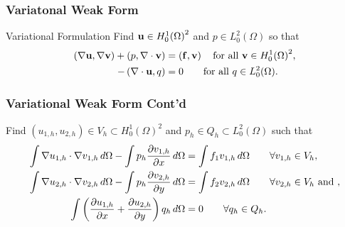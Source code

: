 \documentclass{beamer}
\begin{document}
\begin{frame}
    \frametitle{Variatonal Weak Form}
    \begin{block}{Variational Formulation}
        Find $\mathbf{u} \in H_{0}^{1}{(\Omega)}^2$ and $p \in L_{0}^{2}(\Omega)$
        so that
        \begin{equation}
            \begin{split}
                \left( \nabla \mathbf{u}, \nabla \mathbf{v} \right) + \left( p, \nabla
                    \cdot \mathbf{v} \right) &= \left(\mathbf{f}, \mathbf{v} \right)
                    \quad \text{for all } \mathbf{v} \in H_{0}^{1}
                    {(\Omega)}^{2}, \\
                -\left(\nabla \cdot \mathbf{u}, q \right) &= 0  \qquad \text{for
                    all } q \in{L}_{0}^{2} (\Omega).
            \end{split}
        \end{equation}
    \end{block}
\end{frame}


\begin{frame}
    \frametitle{Variational Weak Form Cont'd}
    Find $(u_{1,h}, u_{2,h}) \in V_h \subset H_{0}^{1}(\Omega)^2$ and $p_h \in
    Q_h \subset L_{0}^{2} (\Omega)$ such that
\begin{equation}
    \begin{split}
        \int \nabla u_{1,h} \cdot \nabla v_{1,h} \,d\Omega - \int p_h \frac{\partial
            v_{1,h}}{\partial x} \,d\Omega &= \int f_1 v_{1,h} \,d\Omega \qquad
            \forall v_{1,h} \in V_h, \\
        \int \nabla u_{2,h} \cdot \nabla v_{2,h} \,d\Omega - \int p_h \frac{\partial
            v_{2,h}}{\partial y} \,d\Omega &= \int f_2 v_{2,h} \,d\Omega \qquad
            \forall v_{2,h} \in V_h \text{ and }, \\
        \int \left(\frac{\partial u_{1,h}}{\partial x} + \frac{\partial u_{2,h}}{\partial y}\right) q_h
            \,d\Omega &= 0 \qquad \forall q_h \in Q_h.
    \end{split}
\end{equation}
\end{frame}
\end{document}
